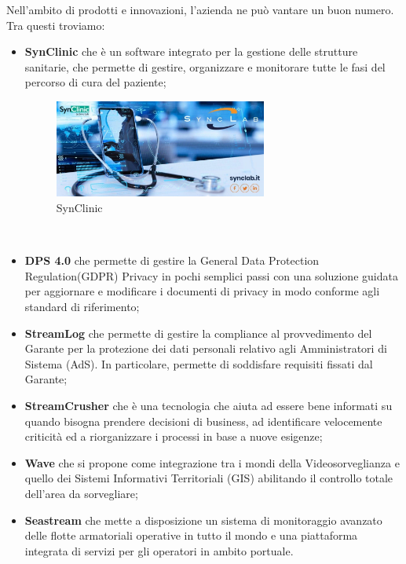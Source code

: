 Nell'ambito di prodotti e innovazioni, l'azienda ne può vantare un buon numero.
Tra questi troviamo: 
\begin{itemize}
	\item \textbf{SynClinic} che è un  software integrato per la gestione delle strutture sanitarie, che permette di gestire, organizzare e monitorare tutte le fasi del percorso di cura del paziente; \\
	\begin{figure}[htbp]	
		\centering
		\includegraphics[width=7cm]{immagini/synClinic.jpg}
		\caption{SynClinic}
		\label{fig:SynClinic}
	\end{figure}
	\\
	\item \textbf{DPS 4.0} che permette di gestire la General Data Protection Regulation(GDPR) Privacy in pochi semplici passi con una soluzione guidata per aggiornare e modificare i documenti di privacy in modo conforme agli standard di riferimento; \\
	\item \textbf{StreamLog} che permette di gestire la compliance al provvedimento del Garante per la protezione dei dati personali relativo agli Amministratori di Sistema (AdS). In particolare, permette di soddisfare requisiti fissati dal Garante; \\
	\item \textbf{StreamCrusher} che è una tecnologia che aiuta ad essere bene informati su quando bisogna prendere decisioni di business, ad identificare velocemente criticità ed a riorganizzare i processi in base a nuove esigenze; \\
	\item \textbf{Wave} che si propone come integrazione tra i mondi della Videosorveglianza e quello dei Sistemi Informativi Territoriali (GIS) abilitando il controllo totale dell'area da sorvegliare; \\
	\item \textbf{Seastream} che mette a disposizione un sistema di monitoraggio avanzato delle flotte armatoriali operative in tutto il mondo e una piattaforma integrata di servizi per gli operatori in ambito portuale. \\
\end{itemize}




